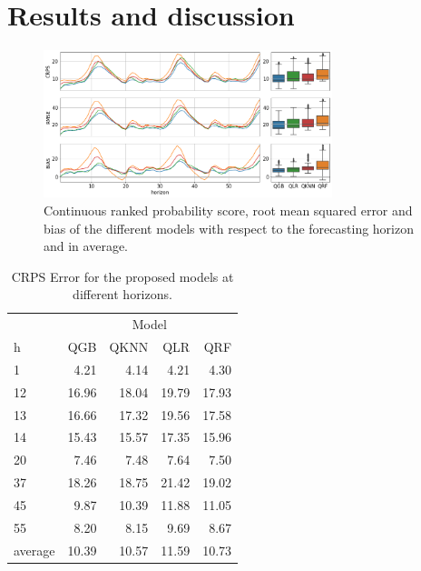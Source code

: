 \documentclass[a4paper,3p,sort&compress]{elsarticle}
\begin{document}
\section{Results and discussion}
\label{sec:results}

\begin{figure}[tbp]
  \centering
  \includegraphics[width=0.75\textwidth]{error_graph}
  \caption{\label{figure:errorGraph}
    Continuous ranked probability score, root mean squared
    error and bias of the different models with respect to the
    forecasting horizon and in average.
  }
\end{figure}

\begin{table}[tbp]
  \centering \footnotesize
  \caption{\label{tab:determ}CRPS Error for the proposed models at different
    horizons.}
  \begin{tabular}{lrrrr}
    \toprule
    & \multicolumn{4}{c}{Model} \\ \cmidrule{2-5} 
    h &    QGB &  QKNN &   QLR &   QRF \\
    \midrule
    1     &  4.21 &   4.14 &  4.21 &  4.30 \\
12    & 16.96 &  18.04 & 19.79 & 17.93 \\
13    & 16.66 &  17.32 & 19.56 & 17.58 \\
14    & 15.43 &  15.57 & 17.35 & 15.96 \\
20    &  7.46 &   7.48 &  7.64 &  7.50 \\
37    & 18.26 &  18.75 & 21.42 & 19.02 \\
45    &  9.87 &  10.39 & 11.88 & 11.05 \\
55    &  8.20 &   8.15 &  9.69 &  8.67 \\

    \midrule
    average & 10.39 &  10.57 & 11.59 & 10.73 \\
    \bottomrule
  \end{tabular}
\end{table}
\end{document}
